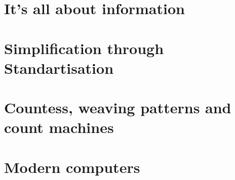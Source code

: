 \documentclass[../../../programming-introduction.tex]{subfiles}
\begin{document}
    \section{It's all about information}
        
        \newpage
    \section{Simplification through Standartisation}
        
        \newpage
    \section{Countess, weaving patterns and count machines}
        
        \newpage
    \section{Modern computers}
        
        \newpage
\end{document}
